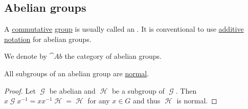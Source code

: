 \subsection{Abelian groups}\label{subsec:abelian_groups}

\begin{definition}\label{def:abelian_group}
  A \hyperref[def:magma/commutative]{commutative} \hyperref[def:group]{group} is usually called an . It is conventional to use \hyperref[rem:additive_magma]{additive notation} for abelian groups.

  We denote by \( \cat{Ab} \) the category of abelian groups.
\end{definition}

\begin{proposition}\label{thm:abelian_normal_subgroups}
  All subgroups of an abelian group are \hyperref[def:normal_subgroup]{normal}.
\end{proposition}
\begin{proof}
  Let \( \mscrG \) be abelian and \( \mscrH \) be a subgroup of \( \mscrG \). Then \( x \mscrG x^{-1} = xx^{-1} \mscrH = \mscrH \) for any \( x \in G \) and thus \( \mscrH \) is normal.
\end{proof}

